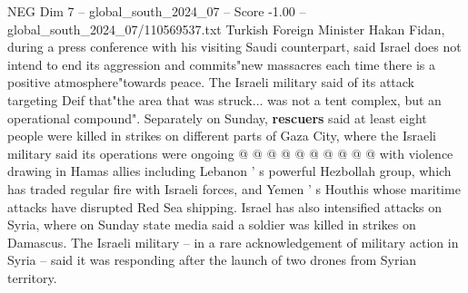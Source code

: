 \begin{textsample}{NEG Dim 7 – global\_south\_2024\_07 – Score -1.00 – global\_south\_2024\_07/110569537.txt}
Turkish Foreign Minister Hakan Fidan, during a press conference with his visiting Saudi counterpart, said Israel does not intend to end its aggression and commits"new massacres each time there is a positive atmosphere"towards peace.
The Israeli military said of its attack targeting Deif that"the area that was struck... was not a tent complex, but an operational compound".
Separately on Sunday, \textbf{rescuers} said at least eight people were killed in strikes on different parts of Gaza City, where the Israeli military said its operations were ongoing @ @ @ @ @ @ @ @ @ @ with violence drawing in Hamas allies including Lebanon ' s powerful Hezbollah group, which has traded regular fire with Israeli forces, and Yemen ' s Houthis whose maritime attacks have disrupted Red Sea shipping.
Israel has also intensified attacks on Syria, where on Sunday state media said a soldier was killed in strikes on Damascus.
The Israeli military -- in a rare acknowledgement of military action in Syria -- said it was responding after the launch of two drones from Syrian territory.

\end{textsample}
